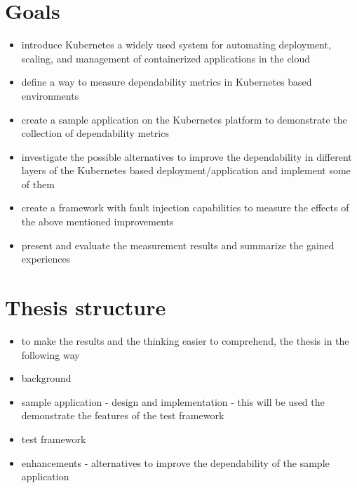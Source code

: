 \section{Goals}

\begin{itemize}
	\item introduce Kubernetes a widely used system for automating deployment, scaling, and management of containerized applications in the cloud
	\item define a way to measure dependability metrics in Kubernetes based environments
	\item create a sample application on the Kubernetes platform to demonstrate the collection of dependability metrics
	\item investigate the possible alternatives to improve the dependability in different layers of the Kubernetes based deployment/application and implement some of them
	\item create a framework with fault injection capabilities to measure the effects of the above mentioned improvements
	\item present and evaluate the measurement results and summarize the gained experiences
\end{itemize}

\section{Thesis structure}

\begin{itemize}
	\item to make the results and the thinking easier to comprehend, the thesis in the following way
	\item background
	\item sample application - design and implementation - this will be used the demonstrate the features of the test framework
	\item test framework
	\item enhancements - alternatives to improve the dependability of the sample application
\end{itemize}

























